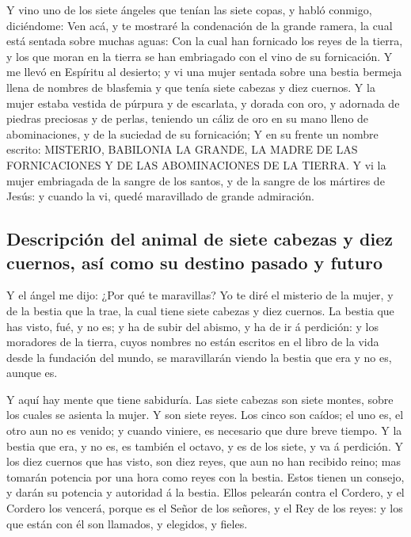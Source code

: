  Y vino uno de los siete ángeles que tenían las siete copas,
y habló conmigo, diciéndome: Ven acá, y te mostraré la condenación de la
grande ramera, la cual está sentada sobre muchas aguas:  Con
la cual han fornicado los reyes de la tierra, y los que moran en la
tierra se han embriagado con el vino de su fornicación.  Y
me llevó en Espíritu al desierto; y vi una mujer sentada sobre una
bestia bermeja llena de nombres de blasfemia y que tenía siete cabezas y
diez cuernos.  Y la mujer estaba vestida de púrpura y de
escarlata, y dorada con oro, y adornada de piedras preciosas y de
perlas, teniendo un cáliz de oro en su mano lleno de abominaciones, y de
la suciedad de su fornicación;  Y en su frente un nombre
escrito: MISTERIO, BABILONIA LA GRANDE, LA MADRE DE LAS FORNICACIONES Y
DE LAS ABOMINACIONES DE LA TIERRA.  Y vi la mujer embriagada
de la sangre de los santos, y de la sangre de los mártires de Jesús: y
cuando la vi, quedé maravillado de grande admiración.

\hypertarget{descripciuxf3n-del-animal-de-siete-cabezas-y-diez-cuernos-asuxed-como-su-destino-pasado-y-futuro}{%
\subsection{Descripción del animal de siete cabezas y diez cuernos, así
como su destino pasado y
futuro}\label{descripciuxf3n-del-animal-de-siete-cabezas-y-diez-cuernos-asuxed-como-su-destino-pasado-y-futuro}}

 Y el ángel me dijo: ¿Por qué te maravillas? Yo te diré el
misterio de la mujer, y de la bestia que la trae, la cual tiene siete
cabezas y diez cuernos.  La bestia que has visto, fué, y no
es; y ha de subir del abismo, y ha de ir á perdición: y los moradores de
la tierra, cuyos nombres no están escritos en el libro de la vida desde
la fundación del mundo, se maravillarán viendo la bestia que era y no
es, aunque es.

 Y aquí hay mente que tiene sabiduría. Las siete cabezas son
siete montes, sobre los cuales se asienta la mujer.  Y son
siete reyes. Los cinco son caídos; el uno es, el otro aun no es venido;
y cuando viniere, es necesario que dure breve tiempo.  Y la
bestia que era, y no es, es también el octavo, y es de los siete, y va á
perdición.  Y los diez cuernos que has visto, son diez
reyes, que aun no han recibido reino; mas tomarán potencia por una hora
como reyes con la bestia.  Estos tienen un consejo, y darán
su potencia y autoridad á la bestia.  Ellos pelearán contra
el Cordero, y el Cordero los vencerá, porque es el Señor de los señores,
y el Rey de los reyes: y los que están con él son llamados, y elegidos,
y fieles.

